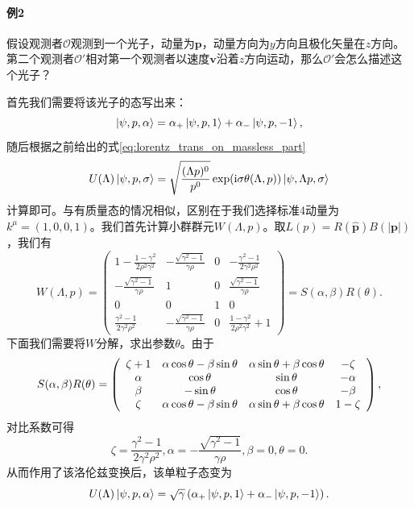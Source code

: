 \paragraph{例2}
假设观测者$ \mathcal{O}$观测到一个光子，动量为$ \boldsymbol{p}$，动量方向为$ y$方向且极化矢量在$z$方向。第二个观测者$ \mathcal{O} '$相对第一个观测者以速度$ \boldsymbol{v}$沿着$ z$方向运动，那么$ \mathcal{O} '$会怎么描述这个光子？

首先我们需要将该光子的态写出来：
\begin{equation*}
	\ket{\psi ,p,\alpha } =\alpha _{+}\ket{\psi ,p,1} +\alpha _{-}\ket{\psi ,p,-1} ,
\end{equation*}
随后根据之前给出的式\ref{eq:lorentz_trans_on_massless_part}
\begin{equation*}
	U( \Lambda )\ket{\psi ,p,\sigma } =\sqrt{\frac{( \Lambda p)^{0}}{p^{0}}}\exp(\mathrm{i} \sigma \theta ( \Lambda ,p))\ket{\psi ,\Lambda p,\sigma }
\end{equation*}
计算即可。与有质量态的情况相似，区别在于我们选择标准4动量为$k^{\mu } =( 1,0,0,1)$。我们首先计算小群群元$W( \Lambda ,p)$。取$L( p) =R(\hat{\boldsymbol{p}}) B(| \boldsymbol{p}| )$，我们有
\begin{equation*}
	W( \Lambda ,p) =\left(\begin{matrix}
		1-\frac{1-\gamma ^{2}}{2\rho ^{2} \gamma ^{2}} & -\frac{\sqrt{\gamma ^{2} -1}}{\gamma \rho } & 0 & -\frac{\gamma ^{2} -1}{2\gamma ^{2} \rho ^{2}}\\
		-\frac{\sqrt{\gamma ^{2} -1}}{\gamma \rho } & 1 & 0 & \frac{\sqrt{\gamma ^{2} -1}}{\gamma \rho }\\
		0 & 0 & 1 & 0\\
		\frac{\gamma ^{2} -1}{2\gamma ^{2} \rho ^{2}} & -\frac{\sqrt{\gamma ^{2} -1}}{\gamma \rho } & 0 & \frac{1-\gamma ^{2}}{2\rho ^{2} \gamma ^{2}} +1
	\end{matrix}\right) =S( \alpha ,\beta ) R( \theta ) .
\end{equation*}
下面我们需要将$W$分解，求出参数$\theta $。由于
\begin{equation*}
	S( \alpha ,\beta ) R( \theta ) =\left(\begin{array}{ c c c c }
		\zeta +1 & \alpha \cos \theta -\beta \sin \theta  & \alpha \sin \theta +\beta \cos \theta  & -\zeta \\
		\alpha  & \cos \theta  & \sin \theta  & -\alpha \\
		\beta  & -\sin \theta  & \cos \theta  & -\beta \\
		\zeta  & \alpha \cos \theta -\beta \sin \theta  & \alpha \sin \theta +\beta \cos \theta  & 1-\zeta 
	\end{array}\right) ,
\end{equation*}
对比系数可得
\begin{equation*}
	\zeta =\frac{\gamma ^{2} -1}{2\gamma ^{2} \rho ^{2}} ,\alpha =-\frac{\sqrt{\gamma ^{2} -1}}{\gamma \rho } ,\beta =0,\theta =0.
\end{equation*}
从而作用了该洛伦兹变换后，该单粒子态变为
\begin{equation*}
	U( \Lambda )\ket{\psi ,p,\alpha } =\sqrt{\gamma }\left( \alpha _{+}\ket{\psi ,p,1} +\alpha _{-}\ket{\psi ,p,-1}\right) .
\end{equation*}

